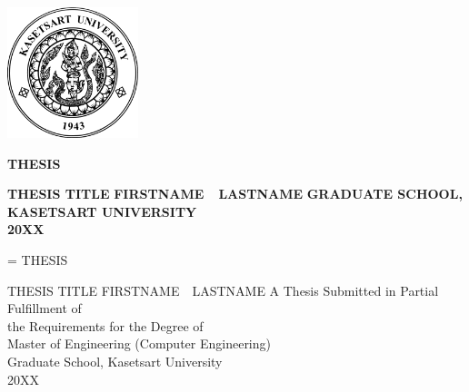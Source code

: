 \thispagestyle{empty}
\setlength{\headsep}{0in}
\begin{titlepage}
\centering
\parskip=0pt
\renewcommand{\baselinestretch}{0}
\fontsize{14pt}{0}
\includegraphics[width=1.5in]{kulogo}
\vspace{0.25in}

{\fontsize{0.25in}{0} \textbf{THESIS} }
\vspace{0.38in}

\textbf{THESIS TITLE}
\vfill
\textbf{FIRSTNAME\ \ LASTNAME}
\vfill
\textbf{GRADUATE SCHOOL, KASETSART UNIVERSITY\\20XX}
\vspace{0.2in}
\end{titlepage}
\setlength{\headsep}{0.4in}

%

\begin{titlepage}
\centering
\parskip=\baselineskip
\renewcommand{\baselinestretch}{0}
\fontsize{12pt}{0}
{\fontsize{14pt}{0}\selectfont THESIS}


{\fontsize{14pt}{0}\selectfont THESIS TITLE}
\vfill
FIRSTNAME\ \ LASTNAME
\vfill
A Thesis Submitted in Partial Fulfillment of \\
the Requirements for the Degree of \\
Master of Engineering (Computer Engineering) \\ 
Graduate School, Kasetsart University \\
20XX
\end{titlepage}
